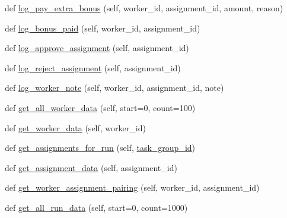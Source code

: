 \begin{DoxyCompactItemize}
\item 
def \hyperlink{classparlai_1_1mturk_1_1core_1_1mturk__data__handler_1_1MTurkDataHandler_a8924cb67f6d2e884091eadc0235dd209}{log\+\_\+pay\+\_\+extra\+\_\+bonus} (self, worker\+\_\+id, assignment\+\_\+id, amount, reason)
\item 
def \hyperlink{classparlai_1_1mturk_1_1core_1_1mturk__data__handler_1_1MTurkDataHandler_af62327d533f06297786cd37c8833289a}{log\+\_\+bonus\+\_\+paid} (self, worker\+\_\+id, assignment\+\_\+id)
\item 
def \hyperlink{classparlai_1_1mturk_1_1core_1_1mturk__data__handler_1_1MTurkDataHandler_adfbc9d075e9c0ffe22fc203676ad0a77}{log\+\_\+approve\+\_\+assignment} (self, assignment\+\_\+id)
\item 
def \hyperlink{classparlai_1_1mturk_1_1core_1_1mturk__data__handler_1_1MTurkDataHandler_a9bf202898899acbf690a2633a32b89da}{log\+\_\+reject\+\_\+assignment} (self, assignment\+\_\+id)
\item 
def \hyperlink{classparlai_1_1mturk_1_1core_1_1mturk__data__handler_1_1MTurkDataHandler_a1cd561165b5924033cc44eaf69c3425c}{log\+\_\+worker\+\_\+note} (self, worker\+\_\+id, assignment\+\_\+id, note)
\item 
def \hyperlink{classparlai_1_1mturk_1_1core_1_1mturk__data__handler_1_1MTurkDataHandler_a188c46e50f06129a289a065809290bf3}{get\+\_\+all\+\_\+worker\+\_\+data} (self, start=0, count=100)
\item 
def \hyperlink{classparlai_1_1mturk_1_1core_1_1mturk__data__handler_1_1MTurkDataHandler_a45c012ee9fa36a52f9286ccc3ab1be3a}{get\+\_\+worker\+\_\+data} (self, worker\+\_\+id)
\item 
def \hyperlink{classparlai_1_1mturk_1_1core_1_1mturk__data__handler_1_1MTurkDataHandler_ad08412db3d132299e287f182fef8b6dc}{get\+\_\+assignments\+\_\+for\+\_\+run} (self, \hyperlink{classparlai_1_1mturk_1_1core_1_1mturk__data__handler_1_1MTurkDataHandler_abef46871b0b4686b67f0b4dcea99e81c}{task\+\_\+group\+\_\+id})
\item 
def \hyperlink{classparlai_1_1mturk_1_1core_1_1mturk__data__handler_1_1MTurkDataHandler_ab41299fc55cf09e4d0921aac63889a86}{get\+\_\+assignment\+\_\+data} (self, assignment\+\_\+id)
\item 
def \hyperlink{classparlai_1_1mturk_1_1core_1_1mturk__data__handler_1_1MTurkDataHandler_a91ba12c1bce3f3af8b760eaf1384a8b9}{get\+\_\+worker\+\_\+assignment\+\_\+pairing} (self, worker\+\_\+id, assignment\+\_\+id)
\item 
def \hyperlink{classparlai_1_1mturk_1_1core_1_1mturk__data__handler_1_1MTurkDataHandler_a260b4003fe27797a7e49547db992d06e}{get\+\_\+all\+\_\+run\+\_\+data} (self, start=0, count=1000)

\end{DoxyCompactItemize}
